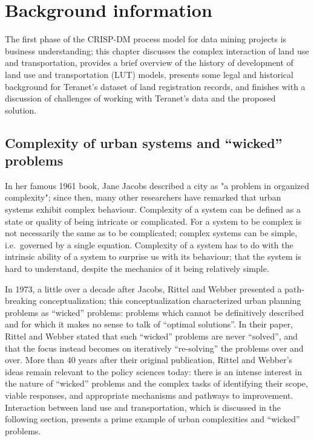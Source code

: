 \chapter[Background information]{Background information} \label{ch:background}

The first phase of the CRISP-DM process model for data mining projects is business understanding;
this chapter discusses the complex interaction of land use and transportation, provides a brief overview of the history of development of land use and transportation (LUT) models, presents some legal and historical background for Teranet's dataset of land registration records, and finishes with a discussion of challenges of working with Teranet's data and the proposed solution.

\section{Complexity of urban systems and ``wicked'' problems} \label{sec:complexity_and_wicked_problems}

In her famous 1961 book, Jane Jacobs\cite{Jacobs1961} described a city as "a problem in organized complexity";
since then, many other researchers have remarked that urban systems exhibit complex behaviour\cite{Batty2008, Bettencourt2013}.
Complexity of a system can be defined as a state or quality of being intricate or complicated.
For a system to be complex is not necessarily the same as to be complicated;
complex systems can be simple, i.e.\ governed by a single equation.
Complexity of a system has to do with the intrinsic ability of a system to surprise us with its behaviour;
that the system is hard to understand, despite the mechanics of it being relatively simple.

In 1973, a little over a decade after Jacobs, Rittel and Webber\cite{Rittel1973} presented a path-breaking conceptualization;
this conceptualization characterized urban planning problems as ``wicked'' problems: problems which cannot be definitively described and for which it makes no sense to talk of ``optimal solutions''.
In their paper, Rittel and Webber stated that such ``wicked'' problems are never ``solved'', and that the focus instead becomes on iteratively ``re-solving'' the problems over and over.
More than 40 years after their original publication, Rittel and Webber's ideas remain relevant to the policy sciences today: there is an intense interest in the nature of ``wicked'' problems and the complex tasks of identifying their scope, viable responses, and appropriate mechanisms and pathways to improvement\cite{Crowley2017}.
Interaction between land use and transportation, which is discussed in the following section, presents a prime example of urban complexities and ``wicked'' problems.

